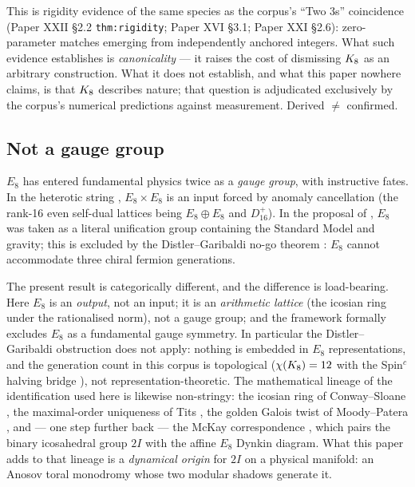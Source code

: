 \documentclass[11pt,a4paper]{article}
\theoremstyle{plain}
\theoremstyle{definition}
\theoremstyle{remark}
\begin{document}
This is rigidity evidence of the same species as the corpus's ``Two 3s'' coincidence (Paper XXII \S2.2 \texttt{thm:rigidity}; Paper XVI \S3.1; Paper XXI \S2.6): zero-parameter matches emerging from independently anchored integers. What such evidence establishes is \emph{canonicality} --- it raises the cost of dismissing $K_8$ as an arbitrary construction. What it does not establish, and what this paper nowhere claims, is that $K_8$ describes nature; that question is adjudicated exclusively by the corpus's numerical predictions against measurement. Derived $\neq$ confirmed.

\subsection{Not a gauge group}\label{sec:notgauge}

$E_8$ has entered fundamental physics twice as a \emph{gauge group}, with instructive fates. In the heterotic string \cite{GHMR}, $E_8 \times E_8$ is an input forced by anomaly cancellation (the rank-16 even self-dual lattices being $E_8 \oplus E_8$ and $D_{16}^+$). In the proposal of \cite{Lisi}, $E_8$ was taken as a literal unification group containing the Standard Model and gravity; this is excluded by the Distler--Garibaldi no-go theorem \cite{DistlerGaribaldi}: $E_8$ cannot accommodate three chiral fermion generations.

The present result is categorically different, and the difference is load-bearing. Here $E_8$ is an \emph{output}, not an input; it is an \emph{arithmetic lattice} (the icosian ring under the rationalised norm), not a gauge group; and the framework formally excludes $E_8$ as a fundamental gauge symmetry. In particular the Distler--Garibaldi obstruction does not apply: nothing is embedded in $E_8$ representations, and the generation count in this corpus is topological ($\chi(K_8) = 12$ with the Spin$^c$ halving bridge \cite{SpincBridge, PaperXXI}), not representation-theoretic. The mathematical lineage of the identification used here is likewise non-stringy: the icosian ring of Conway--Sloane \cite{ConwaySloane}, the maximal-order uniqueness of Tits \cite{Tits}, the golden Galois twist of Moody--Patera \cite{MoodyPatera}, and --- one step further back --- the McKay correspondence \cite{McKay}, which pairs the binary icosahedral group $2I$ with the affine $E_8$ Dynkin diagram. What this paper adds to that lineage is a \emph{dynamical origin} for $2I$ on a physical manifold: an Anosov toral monodromy whose two modular shadows generate it.
\end{document}
